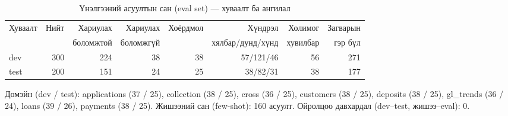 \begin{table}[H]\centering\small
\caption{Үнэлгээний асуултын сан (eval set) --- хуваалт ба ангилал}\label{tab:evalset}
\begin{adjustbox}{max width=\textwidth}
\begin{tabular}{lrrrrrrr}\toprule
Хуваалт & Нийт & Хариулах & Хариулах & Хоёрдмол & Хүндрэл & Холимог & Загварын \\
 & & боломжтой & боломжгүй & & хялбар/дунд/хүнд & хувилбар & гэр бүл \\\midrule
dev & 300 & 224 & 38 & 38 & 57/121/46 & 56 & 271 \\
test & 200 & 151 & 24 & 25 & 38/82/31 & 38 & 177 \\
\bottomrule\end{tabular}
\end{adjustbox}
\par\smallskip\footnotesize Домэйн (dev / test): applications (37 / 25), collection (38 / 25), cross (36 / 25), customers (38 / 25), deposits (38 / 25), gl\_trends (36 / 24), loans (39 / 26), payments (38 / 25). Жишээний сан (few-shot): 160 асуулт. Ойролцоо давхардал (dev--test, жишээ--eval): 0.
\end{table}
